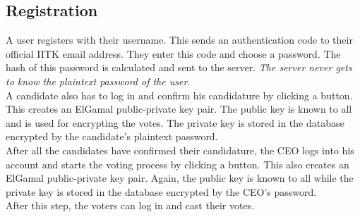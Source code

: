 \documentclass[twoside,twocolumn]{article}
\newcommand\tab[1][1cm]{\hspace*{#1}}
\begin{document}
\subsection{Registration}
    \tab A user registers with their username. This sends an authentication code to their official IITK email address. They enter this code and choose a password. The hash of this password is calculated and sent to the server. \textit{The server never gets to know the plaintext password of the user.}\\
    \tab A candidate also has to log in and confirm his candidature by clicking a button. This creates an ElGamal public-private key pair. The public key is known to all and is used for encrypting the votes. The private key is stored in the database encrypted by the candidate's plaintext password.\\
    \tab After all the candidates have confirmed their candidature, the CEO logs into his account and starts the voting process by clicking a button. This also creates an ElGamal public-private key pair. Again, the public key is known to all while the private key is stored in the database encrypted by the CEO's password.\\
    \tab After this step, the voters can log in and cast their votes.
\end{document}
